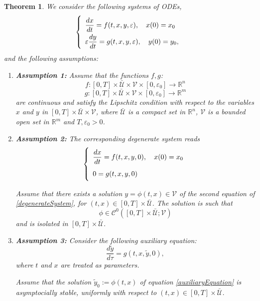 \documentclass{article}
\renewcommand{\epsilon}{\varepsilon}
\newtheorem{theorem}{Theorem}
\begin{document}
\begin{theorem} \cite{banasiak_methods_2014}  \label{tikhonovTheorem}
We consider the following systems of ODEs,
\begin{equation}\label{orginalProbelm}
\def\arraystretch{2}
\left\lbrace \begin{array}{l}
\dfrac{d x}{dt} = f(t,x,y,\epsilon), \quad x(0) = x_0 \\
\epsilon \dfrac{d y}{dt} = g(t,x,y,\epsilon), \quad y(0) = y_0, \\
\end{array} \right.
\end{equation}and the following assumptions:
\begin{enumerate}
\item \textbf{Assumption 1:} Assume that the functions $f, g$:
$$
f : [0, T]\times \mathcal{\bar{U}} \times \mathcal{V} \times [0, \epsilon_0] \rightarrow \mathbb{R}^n
$$
$$
g : [0, T]\times \mathcal{\bar{U}} \times \mathcal{V} \times [0, \epsilon_0] \rightarrow \mathbb{R}^m
$$
are continuous and satisfy the Lipschitz condition with respect to the variables $x$ and $y$ in $[0, T]\times \mathcal{\bar{U}} \times \mathcal{V}$, where $\mathcal{\bar{U}}$ is a compact set in $\mathbb{R}^n$, $\mathcal{V}$ is a bounded open set in $\mathbb{R}^m$ and $T, \epsilon_0 > 0$.
\item \textbf{Assumption 2:} The corresponding degenerate system reads
\begin{equation} \label{degenerateSystem}
\def\arraystretch{2}
\left\lbrace \begin{array}{l}
\dfrac{d x}{dt} = f(t,x,y,0), \quad x(0) = x_0 \\
0 =  g(t,x,y,0)
\end{array} \right.
\end{equation}

Assume that there exists a solution $y = \phi(t, x) \in \mathcal{V}$ of the second equation of \eqref{degenerateSystem}, for $(t,x) \in [0, T]\times \mathcal{\bar{U}}$. The solution is such that
$$
\phi \in \mathcal{C}^0([0, T]\times \mathcal{\bar{U}} ; \mathcal{V})
$$
and is isolated in $[0, T]\times \mathcal{\bar{U}}$.
\item \textbf{Assumption 3:} Consider the following auxiliary equation:
\begin{equation}\label{auxiliaryEquation}
\dfrac{d \tilde{y}}{d \tau} =  g(t,x,\tilde{y},0),
\end{equation}
where $t$ and $x$ are treated as parameters.

Assume that the solution $\tilde{y}_0 := \phi(t, x)$ of equation  \eqref{auxiliaryEquation} is asymptocially stable, uniformly with respect to $(t,x) \in [0, T]\times \mathcal{\bar{U}}$.


\end{enumerate}
\end{theorem}
\end{document}

